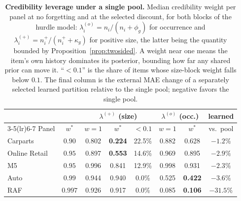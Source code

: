 \begin{table}[t]
\centering
\caption{\textbf{Credibility leverage under a single pool.} Median
credibility weight per panel at no forgetting and at the selected
discount, for both blocks of the hurdle model:
$\lambda^{(o)}_i=n_i/(n_i+\phi_g)$ for occurrence and
$\lambda^{(+)}_i=n_i^{+}/(n_i^{+}+\kappa_g)$ for positive size, the
latter being the quantity bounded by Proposition~\ref{prop:twosided}.
A weight near one means the item's own history dominates its posterior,
bounding how far any shared prior can move it. ``$<0.1$'' is the share of
items whose size-block weight falls below $0.1$. The final column is the
external MAE change of a separately selected learned partition relative to
the single pool; negative favors the single pool.}
\label{tab:leverage}
\small
\setlength{\tabcolsep}{3.0pt}
\begin{tabular}{lccccccc}
\toprule
 & & \multicolumn{3}{c}{$\lambda^{(+)}$ (size)} & \multicolumn{2}{c}{$\lambda^{(o)}$ (occ.)} & learned\\
\cmidrule(lr){3-5}\cmidrule(lr){6-7}
Panel & $w^{*}$ & $w{=}1$ & $w^{*}$ & $<0.1$ & $w{=}1$ & $w^{*}$ & vs.\ pool\\
\midrule
Carparts & $0.90$ & 0.802 & \textbf{0.224} & 22.5\% & 0.882 & 0.628 & $-1.2\%$\\
Online Retail & $0.95$ & 0.897 & \textbf{0.553} & 14.6\% & 0.969 & 0.895 & $-2.9\%$\\
M5 & $0.95$ & 0.996 & 0.841 & 12.9\% & 0.998 & 0.931 & $-2.3\%$\\
Auto & $0.99$ & 0.944 & 0.940 & 0.0\% & 0.525 & \textbf{0.422} & $-3.6\%$\\
RAF & $0.997$ & 0.926 & 0.917 & 0.0\% & 0.085 & \textbf{0.106} & $-31.5\%$\\
\bottomrule
\end{tabular}
\end{table}

